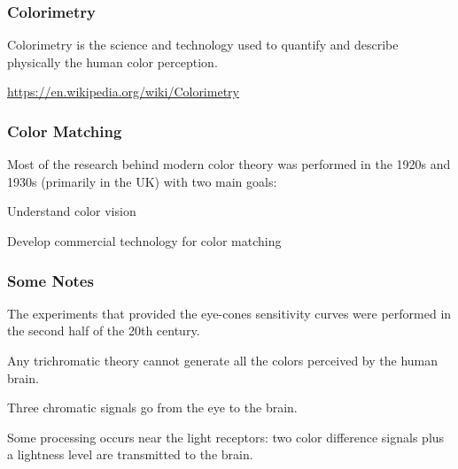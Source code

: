 \documentclass[12pt]{beamer}\usepackage[]{graphicx}\usepackage[]{color}
\begin{document}

\begin{frame}
\begin{center}
\Huge{}
\end{center}
\end{frame}


\begin{frame}
\frametitle{Colorimetry}

Colorimetry is the science and technology used to quantify and describe 
physically the human color perception.
\eb

{\footnotesize \url{https://en.wikipedia.org/wiki/Colorimetry}}

\end{frame}


\begin{frame}
\frametitle{Color Matching}

Most of the research behind modern color theory was performed in the 1920s
and 1930s (primarily in the UK) with two main goals:

\bi
  \item Understand color vision
  \item Develop commercial technology for color matching
\ei
\eb

\end{frame}


\begin{frame}
\frametitle{Some Notes}

\bi
  \item The experiments that provided the eye-cones sensitivity curves were
  performed in the second half of the 20th century.
  \item Any trichromatic theory cannot generate all the colors perceived by 
  the human brain.
  \item Three chromatic signals go from the eye to the brain.
  \item Some processing occurs near the light receptors: two color difference
  signals plus a lightness level are transmitted to the brain.
\ei

\end{frame}
\end{document}
